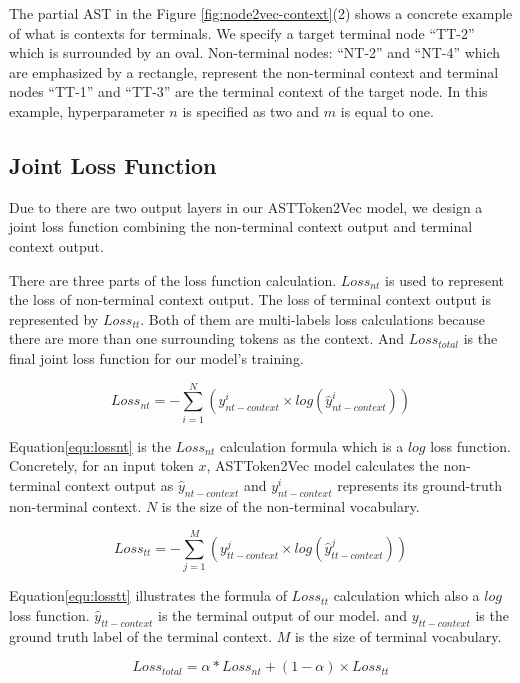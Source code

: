 \documentclass[E]{compsoft}
\begin{document}
The partial AST in the Figure \ref{fig:node2vec-context}(2) shows a concrete example of what is contexts for terminals.
We specify a target terminal node ``TT-2'' which is surrounded by an oval. 
Non-terminal nodes: ``NT-2'' and ``NT-4'' which are emphasized by a rectangle, represent the non-terminal context and terminal nodes ``TT-1'' and ``TT-3'' are the terminal context of the target node. 
In this example, hyperparameter $n$ is specified as two and $m$ is equal to one.

\subsection{Joint Loss Function}
Due to there are two output layers in our ASTToken2Vec model, we design a joint loss function combining the non-terminal context output and terminal context output. 

There are three parts of the loss function calculation. 
$Loss_{nt}$ is used to represent the loss of non-terminal context output. 
The loss of terminal context output is represented by $Loss_{tt}$. 
Both of them are multi-labels loss calculations because there are more than one surrounding tokens as the context. 
And $Loss_{total}$ is the final joint loss function for our model's training.

\begin{equation}
Loss_{nt} = -\sum_{i=1}^{N}(y_{nt-context}^{i} \times log(\hat{y}_{nt-context}^{i}))\label{equ:lossnt}
\end{equation}

Equation\ref{equ:lossnt} is the $Loss_{nt}$ calculation formula which is a $log$ loss function. 
Concretely, for an input token $x$, ASTToken2Vec model calculates the non-terminal context output as $\hat{y}_{nt-context}$ and $y_{nt-context}^{i}$ represents its ground-truth non-terminal context.
$N$ is the size of the non-terminal vocabulary. 


\begin{equation}
Loss_{tt} = -\sum_{j=1}^{M} (y_{tt-context}^{j} \times log(\hat{y}_{tt-context}^{j}))\label{equ:losstt}
\end{equation}

Equation\ref{equ:losstt} illustrates the formula of $Loss_{tt}$ calculation which also a $log$ loss function. 
$\hat{y}_{tt-context}$ is the terminal output of our model. and $y_{tt-context}$ is the ground truth label of the terminal context.
$M$ is the size of terminal vocabulary.

\begin{equation}
Loss_{total} = \alpha * Loss_{nt} + (1-\alpha) \times Loss_{tt}\label{equ:totalloss}
\end{equation}
\end{document}
